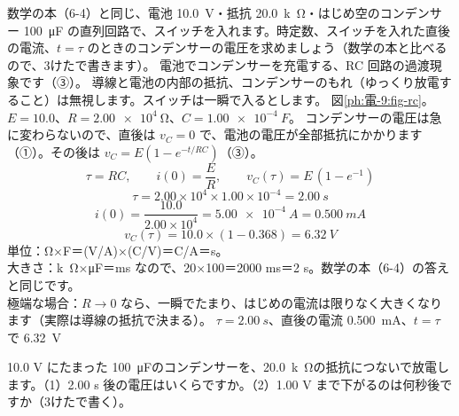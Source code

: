 \label{ph:電-9:ex1}
\begin{phreidai}
数学の本（6-4）と同じ、電池 \qty{10.0}{V}・抵抗 \qty{20.0}{k\ohm}・はじめ空のコンデンサー \qty{100}{\micro F} の直列回路で、スイッチを入れます。時定数、スイッチを入れた直後の電流、$t=\tau$ のときのコンデンサーの電圧を求めましょう（数学の本と比べるので、3けたで書きます）。
\phbamen
電池でコンデンサーを充電する、RC 回路の過渡現象です（③）。
\phmushi
導線と電池の内部の抵抗、コンデンサーのもれ（ゆっくり放電すること）は無視します。スイッチは一瞬で入るとします。
\phzu
図\ref{ph:電-9:fig-rc}。$E=10.0$、$R=\qty{2.00e4}{\ohm}$、$C=\qty{1.00e-4}{F}$。
\phriyu
コンデンサーの電圧は急に変わらないので、直後は $v_C=0$ で、電池の電圧が全部抵抗にかかります（①）。その後は $v_C=E(1-e^{-t/RC})$（③）。
\phtateru
\[ \tau=RC,\qquad i(0)=\frac{E}{R},\qquad v_C(\tau)=E\,(1-e^{-1}) \]
\phtoku
\[ \tau=2.00\times10^4\times1.00\times10^{-4}=\qty{2.00}{s} \]
\[ i(0)=\frac{10.0}{2.00\times10^4}=\qty{5.00e-4}{A}=\qty{0.500}{mA} \]
\[ v_C(\tau)=10.0\times(1-0.368)=\qty{6.32}{V} \]
\phtashikame
単位：Ω×F＝(V/A)×(C/V)＝C/A＝s。\\
大きさ：\si{k\ohm}×\si{\micro F}＝ms なので、20×100＝2000 ms＝2 s。数学の本（6-4）の答えと同じです。\\
極端な場合：$R\to0$ なら、一瞬でたまり、はじめの電流は限りなく大きくなります（実際は導線の抵抗で決まる）。
\kotae $\tau=\qty{2.00}{s}$、直後の電流 \qty{0.500}{mA}、$t=\tau$ で \qty{6.32}{V}
\end{phreidai}
\begin{jibun}
10.0 V にたまった \qty{100}{\micro F}のコンデンサーを、\qty{20.0}{k\ohm}の抵抗につないで放電します。（1）2.00 s 後の電圧はいくらですか。（2）1.00 V まで下がるのは何秒後ですか（3けたで書く）。
\end{jibun}


